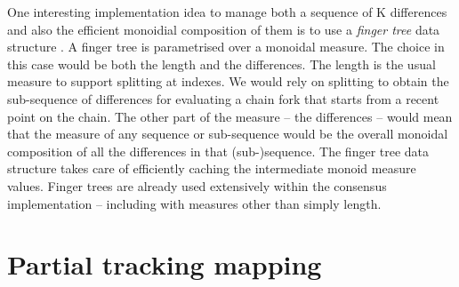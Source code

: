 \documentclass[11pt,a4paper]{article}
\begin{document}
One interesting implementation idea to manage both a sequence of K differences
and also the efficient monoidial composition of them is to use a \emph{finger
tree} data structure \citep{fingertree}. A finger tree is parametrised over a
monoidal measure. The choice in this case would be both the length and the
differences. The length is the usual measure to support splitting at indexes.
We would rely on splitting to obtain the sub-sequence of differences for
evaluating a chain fork that starts from a recent point on the chain. The other
part of the measure -- the differences -- would mean that the measure of any
sequence or sub-sequence would be the overall monoidal composition of all the
differences in that (sub-)sequence. The finger tree data structure takes care
of efficiently caching the intermediate monoid measure values. Finger trees are
already used extensively within the consensus implementation -- including with
measures other than simply length.

\section{Partial tracking mapping}




\end{document}

